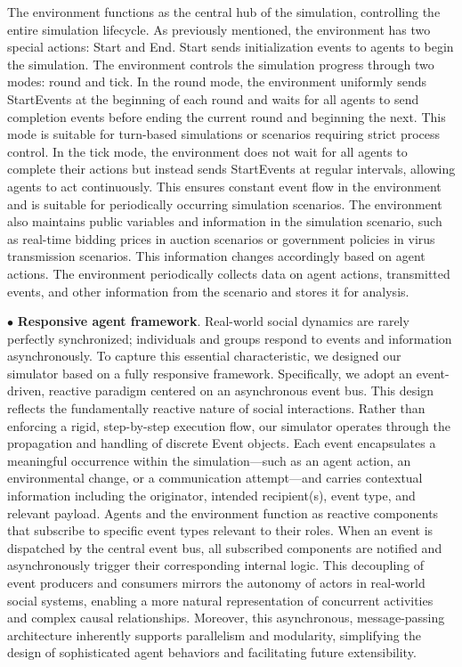 \documentclass{article}
\theoremstyle{definition}
\theoremstyle{theorem}
\theoremstyle{proof}
\theoremstyle{remark}
\begin{document}
    The environment functions as the central hub of the simulation, controlling the entire simulation lifecycle. As previously mentioned, the environment has two special actions: Start and End. Start sends initialization events to agents to begin the simulation. The environment controls the simulation progress through two modes: round and tick. In the round mode, the environment uniformly sends StartEvents at the beginning of each round and waits for all agents to send completion events before ending the current round and beginning the next. This mode is suitable for turn-based simulations or scenarios requiring strict process control. In the tick mode, the environment does not wait for all agents to complete their actions but instead sends StartEvents at regular intervals, allowing agents to act continuously. This ensures constant event flow in the environment and is suitable for periodically occurring simulation scenarios. 
    The environment also maintains public variables and information in the simulation scenario, such as real-time bidding prices in auction scenarios or government policies in virus transmission scenarios. This information changes accordingly based on agent actions. The environment periodically collects data on agent actions, transmitted events, and other information from the scenario and stores it for analysis.
    

    $\bullet$ \textbf{Responsive agent framework}.
    Real-world social dynamics are rarely perfectly synchronized; individuals and groups respond to events and information asynchronously. To capture this essential characteristic, we designed our simulator based on a fully responsive framework.
    Specifically, we adopt an event-driven, reactive paradigm centered on an asynchronous event bus. This design reflects the fundamentally reactive nature of social interactions. Rather than enforcing a rigid, step-by-step execution flow, our simulator operates through the propagation and handling of discrete Event objects. Each event encapsulates a meaningful occurrence within the simulation—such as an agent action, an environmental change, or a communication attempt—and carries contextual information including the originator, intended recipient(s), event type, and relevant payload.
    Agents and the environment function as reactive components that subscribe to specific event types relevant to their roles. When an event is dispatched by the central event bus, all subscribed components are notified and asynchronously trigger their corresponding internal logic. This decoupling of event producers and consumers mirrors the autonomy of actors in real-world social systems, enabling a more natural representation of concurrent activities and complex causal relationships.
    Moreover, this asynchronous, message-passing architecture inherently supports parallelism and modularity, simplifying the design of sophisticated agent behaviors and facilitating future extensibility.
 
\end{document}
